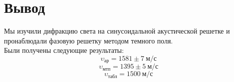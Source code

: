 \documentclass[a4paper, 12pt]{article}
\begin{document}
\section{Вывод}
Мы изучили дифракцию света на синусоидальной акустической решетке и пронаблюдали фазовую решетку методом темного поля.\\
Были получены следующие результаты:\\
$$\upsilon_\text{ар} = 1581 \pm 7\ \text{м/с}$$
$$\upsilon_\text{мтп} = 1395 \pm 5\ \text{м/с}$$
$$\upsilon_\text{табл} = 1500\ \text{м/с}$$
\end{document}
